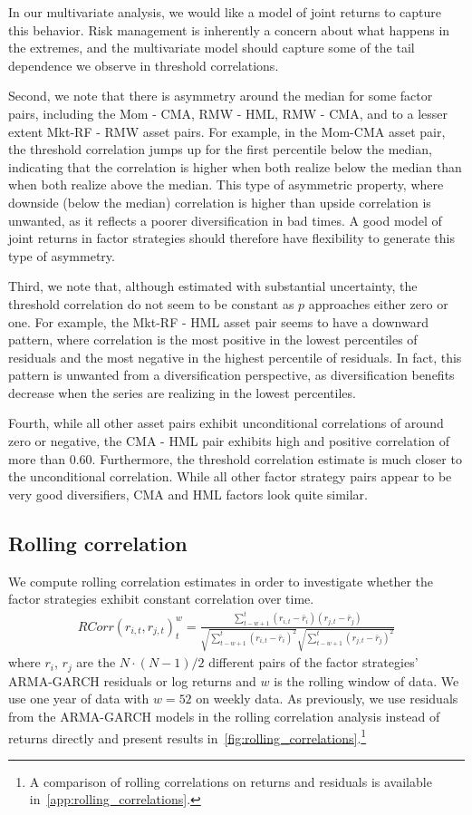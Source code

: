In our multivariate analysis, we would like a model of joint returns to capture this behavior. Risk management is inherently a concern about what happens in the extremes, and the multivariate model should capture some of the tail dependence we observe in threshold correlations.

Second, we note that there is asymmetry around the median for some factor pairs, including the Mom - CMA, RMW - HML, RMW - CMA, and to a lesser extent Mkt-RF - RMW asset pairs. For example, in the Mom-CMA asset pair, the threshold correlation jumps up for the first percentile below the median, indicating that the correlation is higher when both realize below the median than when both realize above the median. This type of asymmetric property, where downside (below the median) correlation is higher than upside correlation is unwanted, as it reflects a poorer diversification in bad times. A good model of joint returns in factor strategies should therefore have flexibility to generate this type of asymmetry.

Third, we note that, although estimated with substantial uncertainty, the threshold correlation do not seem to be constant as $p$ approaches either zero or one. For example, the Mkt-RF - HML asset pair seems to have a downward pattern, where correlation is the most positive in the lowest percentiles of residuals and the most negative in the highest percentile of residuals. In fact, this pattern is unwanted from a diversification perspective, as diversification benefits decrease when the series are realizing in the lowest percentiles.

Fourth, while all other asset pairs exhibit unconditional correlations of around zero or negative, the CMA - HML pair exhibits high and positive correlation of more than 0.60. Furthermore, the threshold correlation estimate is much closer to the unconditional correlation. While all other factor strategy pairs appear to be very good diversifiers, CMA and HML factors look quite similar.

\subsection{Rolling correlation}
We compute rolling correlation estimates in order to investigate whether the factor strategies exhibit constant correlation over time. 
\begin{align}
    RCorr(r_{i, t}, r_{j, t})_t^{w} = \frac{\sum^{t}_{t-w+1}(r_{i, t} - \bar{r}_i)(r_{j,t} - \bar{r}_j)}{\sqrt{\sum^{t}_{t-w+1} (r_{i,t} - \bar{r}_i)^2} \sqrt{\sum^{t}_{t-w+1} (r_{j,t} - \bar{r}_j)^2}}
\end{align}
where $r_i$, $r_j$ are the $N \cdot (N-1) / 2$ different pairs of the factor strategies' ARMA-GARCH residuals or log returns and $w$ is the rolling window of data. We use one year of data with $w = 52$ on weekly data. As previously, we use residuals from the ARMA-GARCH models in the rolling correlation analysis instead of returns directly and present results in~\autoref{fig:rolling_correlations}.\footnote{A comparison of rolling correlations on returns and residuals is available in~\autoref{app:rolling_correlations}.}

